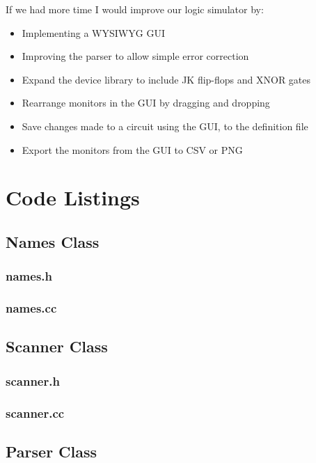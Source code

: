 \documentclass[a4paper,10pt]{article}
\begin{document}
If we had more time I would improve our logic simulator by:

\begin{itemize}
\item Implementing a WYSIWYG GUI
\item Improving the parser to allow simple error correction
\item Expand the device library to include JK flip-flops and XNOR gates
\item Rearrange monitors in the GUI by dragging and dropping
\item Save changes made to a circuit using the GUI, to the definition file
\item Export the monitors from the GUI to CSV or PNG
\end{itemize}

\pagebreak

\appendix
\section{Code Listings}
\subsection{Names Class}
\subsubsection{names.h}

\subsubsection{names.cc}


\subsection{Scanner Class}
\subsubsection{scanner.h}

\subsubsection{scanner.cc}


\subsection{Parser Class}
\end{document}
